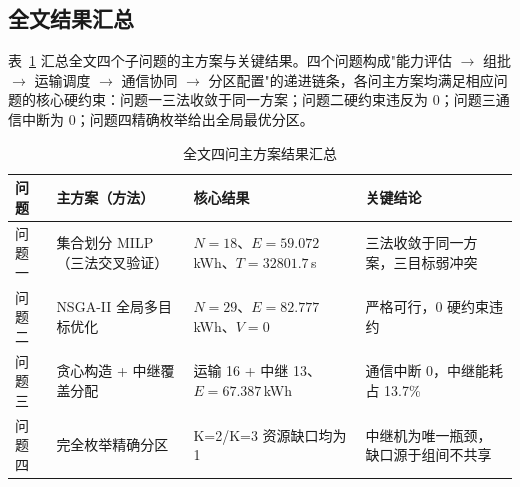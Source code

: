 \subsection{全文结果汇总}

表~\ref{tab:summary} 汇总全文四个子问题的主方案与关键结果。四个问题构成"能力评估 $\to$ 组批 $\to$ 运输调度 $\to$ 通信协同 $\to$ 分区配置"的递进链条，各问主方案均满足相应问题的核心硬约束：问题一三法收敛于同一方案；问题二硬约束违反为 0；问题三通信中断为 0；问题四精确枚举给出全局最优分区。

\begin{table}[htbp]
\centering
\caption{全文四问主方案结果汇总}
\label{tab:summary}
\small
\begin{tabular}{llll}
\toprule
\textbf{问题} & \textbf{主方案（方法）} & \textbf{核心结果} & \textbf{关键结论} \\
\midrule
问题一 & 集合划分 MILP（三法交叉验证） & $N=18$、$E=59.072$\,kWh、$T=32801.7$\,s & 三法收敛于同一方案，三目标弱冲突 \\
问题二 & NSGA-II 全局多目标优化 & $N=29$、$E=82.777$\,kWh、$V=0$ & 严格可行，0 硬约束违约 \\
问题三 & 贪心构造 + 中继覆盖分配 & 运输 16 + 中继 13、$E=67.387$\,kWh & 通信中断 0，中继能耗占 13.7\% \\
问题四 & 完全枚举精确分区 & K=2/K=3 资源缺口均为 1 & 中继机为唯一瓶颈，缺口源于组间不共享 \\
\bottomrule
\end{tabular}
\end{table}
